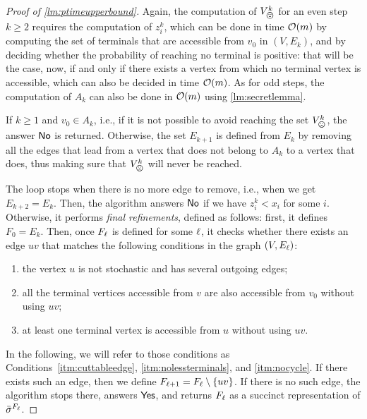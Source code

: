 \begin{proof}[Proof of \cref{lm:ptimeupperbound}]
    Again, the computation of $V_\bad^k$ for an even step $k \geq 2$ requires the computation of $z_i^k$, which can be done in time $\mathcal{O}(m)$ by computing the set of terminals that are accessible from $v_0$ in $(V, E_k)$, and by deciding whether the probability of reaching no terminal is positive: that will be the case, now, if and only if there exists a vertex from which no terminal vertex is accessible, which can also be decided in time $\mathcal{O}(m)$.
    As for odd steps, the computation of $A_k$ can also be done in $\mathcal{O}(m)$ using \cref{lm:secretlemma}.
    
    If $k \geq 1$ and $v_0 \in A_k$, i.e., if it is not possible to avoid reaching the set $V_\bad^k$, the answer $\mathsf{No}$ is returned.
    Otherwise, the set $E_{k+1}$ is defined from $E_k$ by removing all the edges that lead from a vertex that does not belong to $A_k$ to a vertex that does, thus making sure that $V_\bad^k$ will never be reached.

    The loop stops when there is no more edge to remove, i.e., when we get $E_{k+2} = E_k$.
    Then, the algorithm answers $\mathsf{No}$ if we have $z_i^k < x_i$ for some $i$.
    Otherwise, it  performs \emph{final refinements}, defined as follows: first, it defines $F_0 = E_k$.
    Then, once $F_\ell$ is defined for some $\ell$, it checks whether there exists an edge $uv$ that matches the following conditions in the graph $(V, E_\ell)$:
        \begin{enumerate}
            \item\label{itm:cuttableedge} the vertex $u$ is not stochastic and has several outgoing edges;
            \item\label{itm:nolessterminals} all the terminal vertices accessible from $v$ are also accessible from $v_0$ without using $uv$;
            \item\label{itm:nocycle} at least one terminal vertex is accessible from $u$ without using $uv$.
        \end{enumerate}
    In the following, we will refer to those conditions as Conditions~\ref{itm:cuttableedge}, \ref{itm:nolessterminals}, and \ref{itm:nocycle}.
    If there exists such an edge, then we define $F_{\ell+1} = F_\ell \setminus \{uv\}$.
    If there is no such edge, the algorithm stops there, answers $\mathsf{Yes}$, and returns $F_\ell$ as a succinct representation of ${\bar{\sigma}}^{F_\ell}$.
    

\end{proof}
